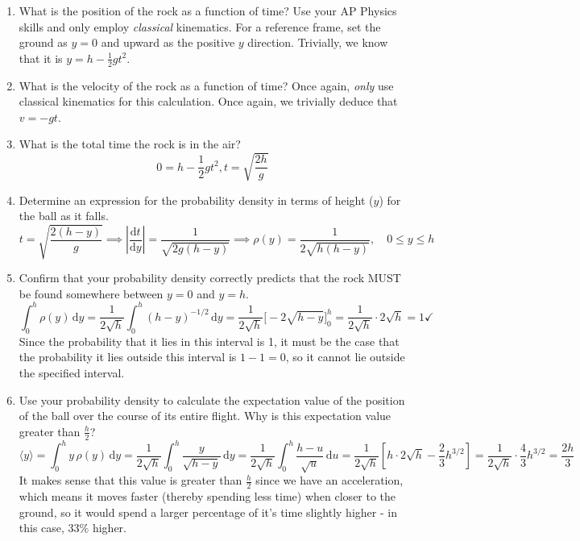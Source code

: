 \documentclass{article}
\begin{document}
\begin{enumerate}[label=\alph*.]
    \item What is the position of the rock as a function of time? Use your AP Physics skills and only employ \textit{classical} kinematics. For a reference frame, set the ground as $ y = 0$ and upward as the positive $y$ direction. 
    \newline \newline 
    Trivially, we know that it is $\boxed{y = h - \frac{1}{2} g t^2}$. 
    \newline 
    \item What is the velocity of the rock as a function of time? Once again, \textit{only} use classical kinematics for this calculation.
    \newline \newline 
    Once again, we trivially deduce that $\boxed{v = -gt}$.
    \newline
    \item What is the total time the rock is in the air?
    \newline
    \[0 = h - \frac 1 2 gt^2, \boxed{t = \sqrt{\frac{2h}{g}}}\]
    \item Determine an expression for the probability density in terms of height ($y$) for the ball as it falls.
    \\ 
    \[t = \sqrt{\frac{2(h-y)}{g}}
        \implies
        \left|\frac{\mathrm{d}t}{\mathrm{d}y}\right| = \frac{1}{\sqrt{2g(h-y)}} \implies \boxed{\rho(y) = \frac{1}{2\sqrt{h(h-y)}}, \quad 0 \le y \le h}\]
    \item Confirm that your probability density correctly predicts that the rock MUST be found somewhere between $ y = 0$ and $y=h$. 
    \\ 
    \[
        \int_0^h \rho(y)\,\mathrm{d}y
        = \frac{1}{2\sqrt{h}}\int_0^h (h-y)^{-1/2}\,\mathrm{d}y
        = \frac{1}{2\sqrt{h}}\Big[-2\sqrt{h-y}\Big]_0^h
        = \frac{1}{2\sqrt{h}}\cdot 2\sqrt{h} = 1 \checkmark
    \]
    Since the probability that it lies in this interval is 1, it must be the case that the probability it lies outside this interval is $1-1 = 0$, so it cannot lie outside the specified interval.
    \item Use your probability density to calculate the expectation value of the position of the ball over the course of its entire flight. Why is this expectation value greater than $\frac h 2$?
    \\
    \[
        \langle y \rangle
        = \int_0^h y\,\rho(y)\,\mathrm{d}y
        = \frac{1}{2\sqrt{h}}\int_0^h \frac{y}{\sqrt{h-y}}\,\mathrm{d}y= \frac{1}{2\sqrt{h}}\int_0^h \frac{h-u}{\sqrt{u}}\,\mathrm{d}u
        = \frac{1}{2\sqrt{h}}\left[h \cdot 2\sqrt{h} - \frac{2}{3}h^{3/2}\right]
        = \frac{1}{2\sqrt{h}}\cdot\frac{4}{3}h^{3/2}
        = \boxed{\frac{2h}{3}}
    \]
    It makes sense that this value is greater than $\frac h 2$ since we have an acceleration, which means it moves faster (thereby spending less time) when closer to the ground, so it would spend a larger percentage of it's time slightly higher - in this case, $33\%$ higher. 
\end{enumerate}
\end{document}
